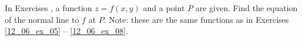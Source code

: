 {\noindent In Exercises}
{, a function $z=f(x,y)$ and a point $P$ are given. Find the equation of the normal line to $f$ at $P$. Note: these are the same functions as in  Exercises \ref{12_06_ex_05} -- \ref{12_06_ex_08}.
}
